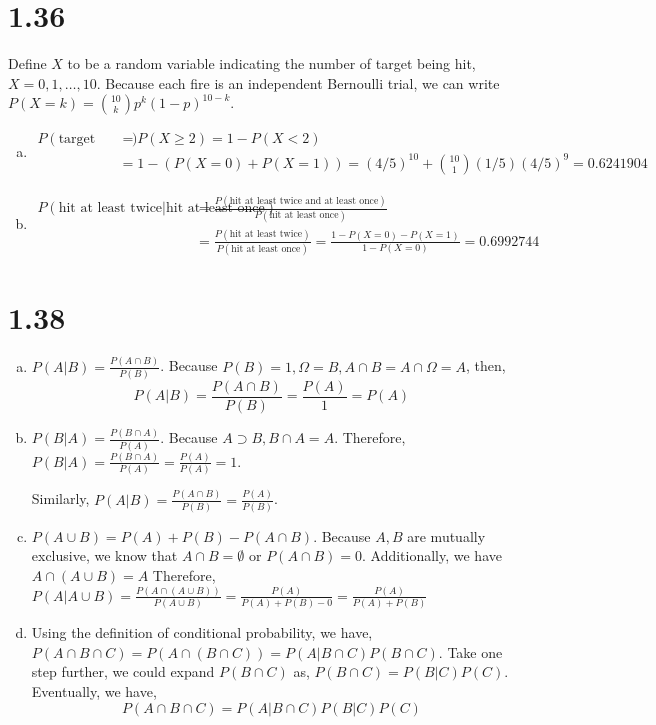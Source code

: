 \documentclass[letterpaper]{article}
\begin{document}
    \section*{1.36}
    Define $X$ to be a random variable indicating the number of target being hit, $X = 0, 1, \dots, 10$. Because each fire is an independent Bernoulli trial, we can write $P(X = k) = \binom{10}{k} p^k (1-p)^{10-k}$.
    \begin{enumerate}[(a)]
    \item
    \begin{align*}
    P(\text{target being hit at least twice}) & = P(X \geq 2) = 1 - P(X < 2) \\
    & = 1- \left(P(X = 0) + P(X = 1)\right) = (4/5)^{10} + \binom{10}{1} (1/5) (4/5)^9 = 0.6241904 
    \end{align*}
    \item
    \begin{align*}
    P(\text{hit at least twice}|\text{hit at least once}) & = \frac{P(\text{hit at least twice and at least once})}{P(\text{hit at least once})} \\
    & = \frac{P(\text{hit at least twice})}{P(\text{hit at least once})} = \frac{1-P(X=0)-P(X=1)}{1-P(X=0)} = 0.6992744
    \end{align*}
    \end{enumerate}
    
    \section*{1.38}
    \begin{enumerate}[(a)]
    \item $P(A|B) = \frac{P(A \cap B)}{P(B)}$. Because $P(B) = 1, \Omega = B, A \cap B = A \cap \Omega = A$, then,
    \[
        P(A|B) = \frac{P(A \cap B)}{P(B)} = \frac{P(A)}{1} = P(A)
    \]
    \item $P(B|A) = \frac{P(B \cap A)}{P(A)}$. Because $A \supset B, B \cap A = A$. Therefore, $P(B|A) = \frac{P(B \cap A)}{P(A)} = \frac{P(A)}{P(A)} = 1$.

    Similarly, $P(A|B) = \frac{P(A \cap B)}{P(B)} = \frac{P(A)}{P(B)}$.

    \item $P(A \cup B) = P(A) + P(B) - P(A \cap B)$. Because $A, B$ are mutually exclusive, we know that $A \cap B = \emptyset$ or $P(A \cap B) = 0$.
    Additionally, we have $A \cap (A \cup B) = A$
    Therefore, $P(A|A \cup B) = \frac{P(A \cap \left(A \cup B \right))}{P(A \cup B)} = \frac{P(A)}{P(A)+P(B)-0} = \frac{P(A)}{P(A)+P(B)}$

    \item Using the definition of conditional probability, we have, 
    $P(A \cap B \cap C) = P\left(A \cap (B \cap C)\right) = P(A|B \cap C)P(B\cap C)$. Take one step further, we could expand $P(B \cap C)$ as, $P(B \cap C) = P(B|C)P(C)$. Eventually, we have,
    \[
    P(A \cap B \cap C) = P(A|B \cap C)P(B|C)P(C)
    \]

    \end{enumerate}
\end{document}
